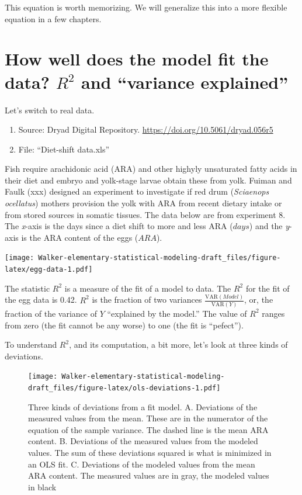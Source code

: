 \documentclass[]{book}
\providecommand{\tightlist}{%
  \setlength{\itemsep}{0pt}\setlength{\parskip}{0pt}}
\begin{document}
This equation is worth memorizing. We will generalize this into a more
flexible equation in a few chapters.

\section{\texorpdfstring{How well does the model fit the data? \(R^2\)
and ``variance
explained''}{How well does the model fit the data? R\^{}2 and variance explained}}\label{how-well-does-the-model-fit-the-data-r2-and-variance-explained}

Let's switch to real data.

\begin{enumerate}
\def\labelenumi{\arabic{enumi}.}
\tightlist
\item
  Source: Dryad Digital Repository.
  \url{https://doi.org/10.5061/dryad.056r5}
\item
  File: ``Diet-shift data.xls''
\end{enumerate}

Fish require arachidonic acid (ARA) and other highyly unsaturated fatty
acids in their diet and embryo and yolk-stage larvae obtain these from
yolk. Fuiman and Faulk (xxx) designed an experiment to investigate if
red drum (\emph{Sciaenops ocellatus}) mothers provision the yolk with
ARA from recent dietary intake or from stored sources in somatic
tissues. The data below are from experiment 8. The \emph{x}-axis is the
days since a diet shift to more and less ARA (\(days\)) and the
\emph{y}-axis is the ARA content of the eggs (\(ARA\)).

\texttt{[image: Walker-elementary-statistical-modeling-draft\_files/figure-latex/egg-data-1.pdf]}

The statistic \(R^2\) is a measure of the fit of a model to data. The
\(R^2\) for the fit of the egg data is 0.42. \(R^2\) is the fraction of
two variances \(\frac{\mathrm{VAR}(Model)}{\mathrm{VAR}(Y)}\), or, the
fraction of the variance of \(Y\) ``explained by the model.'' The value
of \(R^2\) ranges from zero (the fit cannot be any worse) to one (the
fit is ``pefect'').

To understand \(R^2\), and its computation, a bit more, let's look at
three kinds of deviations.

\begin{figure}
\centering
\texttt{[image: Walker-elementary-statistical-modeling-draft\_files/figure-latex/ols-deviations-1.pdf]}
\caption{\label{fig:ols-deviations}Three kinds of deviations from a fit
model. A. Deviations of the measured values from the mean. These are in
the numerator of the equation of the sample variance. The dashed line is
the mean ARA content. B. Deviations of the measured values from the
modeled values. The sum of these deviations squared is what is minimized
in an OLS fit. C. Deviations of the modeled values from the mean ARA
content. The measured values are in gray, the modeled values in black}
\end{figure}
\end{document}
